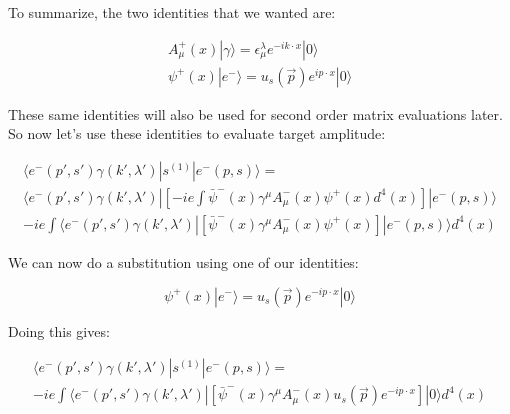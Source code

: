 \documentclass[a4]{article}
\begin{document}
\begin{framed}
        To summarize, the two identities that we wanted are:

        \begin{equation}
            \begin{aligned}
                A_{\mu}^{+} (x) | \gamma \rangle = \epsilon^{\lambda}_{\mu} e^{- i k \cdot x} | 0 \rangle \\
                \psi^{+} (x) | e^{-} \rangle = u_{s} (\vec{p}) e^{i p \cdot x} | 0 \rangle
            \end{aligned}
        \end{equation}

        These same identities will also be used for second order matrix evaluations later. So now let's use these
        identities to evaluate target amplitude:

        \begin{equation}
            \begin{aligned}
                \langle e^{-} (p', s') \gamma (k', \lambda') | s^{(1)} | e^{-} (p, s) \rangle = \\
                \langle e^{-} (p', s') \gamma (k', \lambda') | [- i e \int \bar{\psi}^{-} (x) \gamma^{\mu} A_{\mu}^{-} (x) \psi^{+} (x) d^{4} (x)] | e^{-} (p, s) \rangle \\
                - i e \int \langle e^{-} (p', s') \gamma (k', \lambda') | [\bar{\psi}^{-} (x) \gamma^{\mu} A_{\mu}^{-} (x) \psi^{+} (x)] | e^{-} (p, s) \rangle d^{4} (x)
            \end{aligned}
        \end{equation}

        We can now do a substitution using one of our identities:

        \begin{equation}
            \psi^{+} (x) | e^{-} \rangle = u_{s} (\vec{p}) e^{- i p \cdot x} | 0 \rangle
        \end{equation}

        Doing this gives:

        \begin{equation}
            \begin{aligned}
                \langle e^{-} (p', s') \gamma (k', \lambda') | s^{(1)} | e^{-} (p, s) \rangle = \\
                - i e \int \langle e^{-} (p', s') \gamma (k', \lambda') | [\bar{\psi}^{-} (x) \gamma^{\mu} A_{\mu}^{-} (x) u_{s} (\vec{p}) e^{- i p \cdot x}] | 0 \rangle d^{4} (x)
            \end{aligned}
        \end{equation}


\end{framed}
\end{document}
